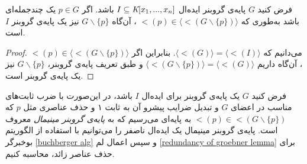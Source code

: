 \begin{lemma}
	\label{redundancy of groebner lemma}
فرض کنید 
$G$
پایه‌ی گروبنر ایده‌ال 
$I\subseteq\textit{K}[x_{1},...,x_{n}]$
باشد. اگر 
$p\in G$
یک چندجمله‌ای باشد به‌طوری که 
$\lt(p)\in\langle\lt(G\backslash\{p\})\rangle$
، آن‌گاه 
$G\backslash\{p\}$
نیز یک پایه‌ی گروبنر 
$I$
است.
\end{lemma}
\begin{proof}
می‌دانیم که 
$\langle\lt(G)\rangle = \langle\lt(I)\rangle$.
بنابراین اگر 
$\lt(p)\in\langle\lt(G\backslash\{p\})\rangle$
، آن‌گاه داریم
$\langle\lt(G\backslash\{p\})\rangle = \langle\lt(G)\rangle$
و طبق تعریف پایه‌ی گروبنر، 
$G\backslash\{p\}$
نیز یک پایه‌ی گروبنر است.
\end{proof}

فرض کنید 
$G$
یک پایه‌ی گروبنر برای ایده‌ال 
$I$
باشد، در این‌صورت با ضرب ثابت‌های مناسب در اعضای 
$G$
و تبدیل ضرایب پیشرو آن به ثابت ۱ و حذف عناصری مثل 
$p$
که 
$\lt(p)\in\lt(G\backslash\{p\})$
به پایه‌ای می‌رسیم که به 
\textit{پایه‌ی گروبنر مینیمال }
معروف است. پایه‌ی گروبنر مینیمال یک ایده‌ال ناصفر را می‌توانیم با استفاده از الگوریتم بوخبرگر
\ref{buchberger alg}
و سپس اعمال لم 
\ref{redundancy of groebner lemma}
برای حذف عناصر زائد، محاسبه کنیم. 
